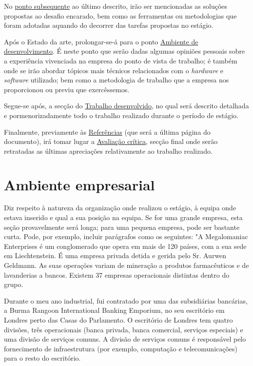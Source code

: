 \documentclass{article}
\begin{document}
\hspace*{0.5cm} No \hyperref[sec:est-art]{ponto subsequente} ao último descrito, irão ser mencionadas as soluções propostas ao desafio encarado, bem como as ferramentas ou metodologias que foram adotadas aquando do decorrer das tarefas propostas no estágio.

\hspace*{0.5cm} Após o Estado da arte, prolongar-se-á para o ponto \hyperref[sec:amb-dev]{Ambiente de desenvolvimento}. É neste ponto que serão dadas algumas opiniões pessoais sobre a experiência vivenciada na empresa do ponto de vista de trabalho; é também onde se irão abordar tópicos mais técnicos relacionados com o \emph{hardware} e \emph{software} utilizado; bem como a metodologia de trabalho que a empresa nos proporcionou ou previu que exercêssemos.

\hspace{0.5cm} Segue-se após, a secção do \hyperref[sec:trab-dev]{Trabalho desenvolvido}, no qual será descrito detalhada e pormenorizadamente todo o trabalho realizado durante o período de estágio.

\hspace{0.5cm} Finalmente, previamente às \hyperref[referencias]{Referências} (que será a última página do documento), irá tomar lugar a \hyperref[sec:ava-crt]{Avaliação crítica}, secção final onde serão retratadas as últimas apreciações relativamente ao trabalho realizado.

\cleardoublepage
\section{Ambiente empresarial}
\label{sec:amb-emp}
Diz respeito à natureza da organização onde realizou o estágio, à equipa onde estava inserido e qual a sua posição na equipa. Se for uma grande empresa, esta seção provavelmente será longa; para uma pequena empresa, pode ser bastante curta. Pode, por exemplo, incluir parágrafos como os seguintes:
"A Megalomaniac Enterprises é um conglomerado que opera em mais de 120 países, com a sua sede em Liechtenstein. É uma empresa privada detida e gerida pelo Sr. Aurwen Geldmann. As suas operações variam de mineração a produtos farmacêuticos e de lavanderias a bancos. Existem 37 empresas operacionais distintas dentro do grupo.

Durante o meu ano industrial, fui contratado por uma das subsidiárias bancárias, a Burma Rangoon International Banking Emporium, no seu escritório em Londres perto das Casas do Parlamento. O escritório de Londres tem quatro divisões, três operacionais (banca privada, banca comercial, serviços especiais) e uma divisão de serviços comuns. A divisão de serviços comuns é responsável pelo fornecimento de infraestrutura (por exemplo, computação e telecomunicações) para o resto do escritório. 
\end{document}
